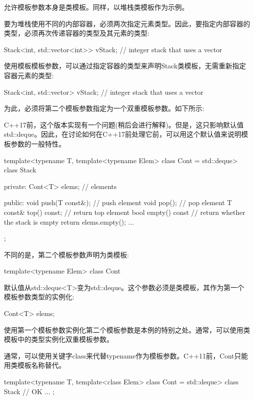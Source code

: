允许模板参数本身是类模板。同样，以堆栈类模板作为示例。

要为堆栈使用不同的内部容器，必须两次指定元素类型。因此，要指定内部容器的类型，必须再次传递容器的类型及其元素的类型:

\begin{cpp}
Stack<int, std::vector<int>> vStack; // integer stack that uses a vector
\end{cpp}

使用模板模板参数，可以通过指定容器的类型来声明Stack类模板，无需重新指定容器元素的类型:

\begin{cpp}
Stack<int, std::vector> vStack; // integer stack that uses a vector
\end{cpp}

为此，必须将第二个模板参数指定为一个双重模板参数。如下所示:

\begin{notice}C++17前，这个版本实现有一个问题(稍后会进行解释)。但是，这只影响默认值std::deque。因此，在讨论如何在C++17前处理它前，可以用这个默认值来说明模板参数的一般特性。
\end{notice}

\begin{cpp}
template<typename T,
		template<typename Elem> class Cont = std::deque>
class Stack {
private:
	Cont<T> elems; // elements
	
public:
	void push(T const&); // push element
	void pop(); // pop element
	T const& top() const; // return top element
	bool empty() const { // return whether the stack is empty
		return elems.empty();
	}
	...
};
\end{cpp}

不同的是，第二个模板参数声明为类模板:

\begin{cpp}
template<typename Elem> class Cont
\end{cpp}

默认值从std::deque<T>变为std::deque。这个参数必须是类模板，其作为第一个模板参数类型的实例化:

\begin{cpp}
Cont<T> elems;
\end{cpp}

使用第一个模板参数实例化第二个模板参数是本例的特别之处。通常，可以使用类模板中的类型实例化双重模板参数。

通常，可以使用关键字class来代替typename作为模板参数。C++11前，Cont只能用类模板名称替代。

\begin{cpp}
template<typename T,
		template<class Elem> class Cont = std::deque>
class Stack { // OK
	...
};
\end{cpp}

